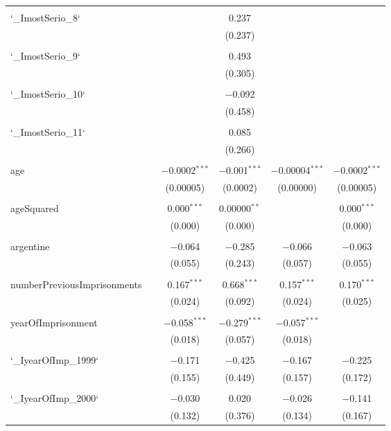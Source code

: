 \begin{table}[!htbp]
\begin{tabular}{@{\extracolsep{5pt}}lccccc}
  & & & & & \\ 
 `\_ImostSerio\_8` &  &  & 0.237 &  &  \\ 
  &  &  & (0.237) &  &  \\ 
  & & & & & \\ 
 `\_ImostSerio\_9` &  &  & 0.493 &  &  \\ 
  &  &  & (0.305) &  &  \\ 
  & & & & & \\ 
 `\_ImostSerio\_10` &  &  & $-$0.092 &  &  \\ 
  &  &  & (0.458) &  &  \\ 
  & & & & & \\ 
 `\_ImostSerio\_11` &  &  & 0.085 &  &  \\ 
  &  &  & (0.266) &  &  \\ 
  & & & & & \\ 
 age &  & $-$0.0002$^{***}$ & $-$0.001$^{***}$ & $-$0.00004$^{***}$ & $-$0.0002$^{***}$ \\ 
  &  & (0.00005) & (0.0002) & (0.00000) & (0.00005) \\ 
  & & & & & \\ 
 ageSquared &  & 0.000$^{***}$ & 0.00000$^{**}$ &  & 0.000$^{***}$ \\ 
  &  & (0.000) & (0.000) &  & (0.000) \\ 
  & & & & & \\ 
 argentine &  & $-$0.064 & $-$0.285 & $-$0.066 & $-$0.063 \\ 
  &  & (0.055) & (0.243) & (0.057) & (0.055) \\ 
  & & & & & \\ 
 numberPreviousImprisonments &  & 0.167$^{***}$ & 0.668$^{***}$ & 0.157$^{***}$ & 0.170$^{***}$ \\ 
  &  & (0.024) & (0.092) & (0.024) & (0.025) \\ 
  & & & & & \\ 
 yearOfImprisonment &  & $-$0.058$^{***}$ & $-$0.279$^{***}$ & $-$0.057$^{***}$ &  \\ 
  &  & (0.018) & (0.057) & (0.018) &  \\ 
  & & & & & \\ 
 `\_IyearOfImp\_1999` &  & $-$0.171 & $-$0.425 & $-$0.167 & $-$0.225 \\ 
  &  & (0.155) & (0.449) & (0.157) & (0.172) \\ 
  & & & & & \\ 
 `\_IyearOfImp\_2000` &  & $-$0.030 & 0.020 & $-$0.026 & $-$0.141 \\ 
  &  & (0.132) & (0.376) & (0.134) & (0.167) \\ 

\end{tabular}
\end{table}
